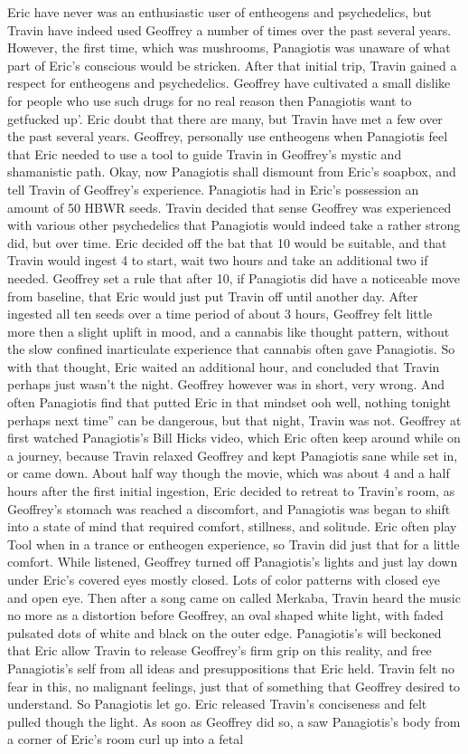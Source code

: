 \documentclass[12pt]{book}
\begin{document}
Eric have never was an enthusiastic user of entheogens and psychedelics, but Travin have indeed used Geoffrey a number of times over the past several years. However, the first time, which was mushrooms, Panagiotis was unaware of what part of Eric's conscious would be stricken. After that initial trip, Travin gained a respect for entheogens and psychedelics. Geoffrey have cultivated a small dislike for people who use such drugs for no real reason then Panagiotis want to getfucked up'. Eric doubt that there are many, but Travin have met a few over the past several years. Geoffrey, personally use entheogens when Panagiotis feel that Eric needed to use a tool to guide Travin in Geoffrey's mystic and shamanistic path. Okay, now Panagiotis shall dismount from Eric's soapbox, and tell Travin of Geoffrey's experience. Panagiotis had in Eric's possession an amount of 50 HBWR seeds. Travin decided that sense Geoffrey was experienced with various other psychedelics that Panagiotis would indeed take a rather strong did, but over time. Eric decided off the bat that 10 would be suitable, and that Travin would ingest 4 to start, wait two hours and take an additional two if needed. Geoffrey set a rule that after 10, if Panagiotis did have a noticeable move from baseline, that Eric would just put Travin off until another day. After ingested all ten seeds over a time period of about 3 hours, Geoffrey felt little more then a slight uplift in mood, and a cannabis like thought pattern, without the slow confined inarticulate experience that cannabis often gave Panagiotis. So with that thought, Eric waited an additional hour, and concluded that Travin perhaps just wasn't the night. Geoffrey however was in short, very wrong. And often Panagiotis find that putted Eric in that mindset ooh well, nothing tonight perhaps next time'' can be dangerous, but that night, Travin was not. Geoffrey at first watched Panagiotis's Bill Hicks video, which Eric often keep around while on a journey, because Travin relaxed Geoffrey and kept Panagiotis sane while set in, or came down. About half way though the movie, which was about 4 and a half hours after the first initial ingestion, Eric decided to retreat to Travin's room, as Geoffrey's stomach was reached a discomfort, and Panagiotis was began to shift into a state of mind that required comfort, stillness, and solitude. Eric often play Tool when in a trance or entheogen experience, so Travin did just that for a little comfort. While listened, Geoffrey turned off Panagiotis's lights and just lay down under Eric's covered eyes mostly closed. Lots of color patterns with closed eye and open eye. Then after a song came on called Merkaba, Travin heard the music no more as a distortion before Geoffrey, an oval shaped white light, with faded pulsated dots of white and black on the outer edge. Panagiotis's will beckoned that Eric allow Travin to release Geoffrey's firm grip on this reality, and free Panagiotis's self from all ideas and presuppositions that Eric held. Travin felt no fear in this, no malignant feelings, just that of something that Geoffrey desired to understand. So Panagiotis let go. Eric released Travin's conciseness and felt pulled though the light. As soon as Geoffrey did so, a saw Panagiotis's body from a corner of Eric's room curl up into a fetal 
\end{document}
